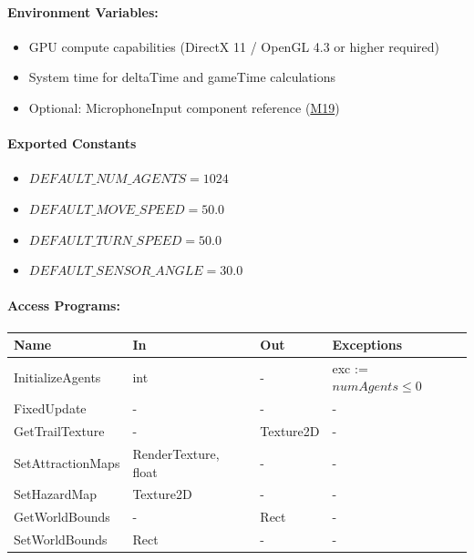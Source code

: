 \documentclass[12pt, titlepage]{article}
\begin{document}
\paragraph{Environment Variables:}
\begin{itemize}
\item GPU compute capabilities (DirectX 11 / OpenGL 4.3 or higher required)
\item System time for deltaTime and gameTime calculations
\item Optional: MicrophoneInput component reference (\hyperref[M19]{M19})
\end{itemize}

\paragraph{Exported Constants}
\begin{itemize}
\item $DEFAULT\_NUM\_AGENTS = 1024$
\item $DEFAULT\_MOVE\_SPEED = 50.0$
\item $DEFAULT\_TURN\_SPEED = 50.0$
\item $DEFAULT\_SENSOR\_ANGLE = 30.0$
\end{itemize}

\paragraph{Access Programs:}

\begin{center}
\begin{tabular}{p{35mm}p{42mm}p{22mm}p{35mm}}
\toprule
\textbf{Name} & \textbf{In} & \textbf{Out} & \textbf{Exceptions} \\
\midrule
InitializeAgents & int & - & exc := $numAgents \leq 0$ \\
FixedUpdate & - & - & - \\
GetTrailTexture & - & Texture2D & - \\
SetAttractionMaps & RenderTexture, float & - & - \\
SetHazardMap & Texture2D & - & - \\
GetWorldBounds & - & Rect & - \\
SetWorldBounds & Rect & - & - \\
\bottomrule
\end{tabular}
\end{center}
\end{document}
